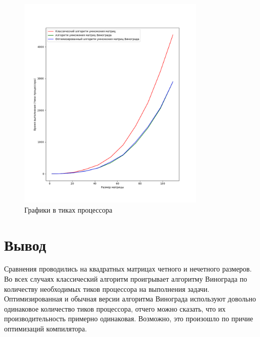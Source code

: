 \clearpage

\begin{figure}[h]
    \centering
    \includegraphics[width=0.8\textwidth]{images/Figure_1}
    \caption{Графики в тиках процессора}
    \label{fig:images-Figure_1}
\end{figure}

\section{Вывод}

Сравнения проводились на квадратных матрицах четного и нечетного размеров. Во всех случаях
классический алгоритм проигрывает алгоритму Винограда по количеству необходимых тиков
процессора на выполнения задачи. Оптимизированная и обычная версии алгоритма Винограда
используют довольно одинаковое количество тиков процессора, отчего можно сказать,
что их производительность примерно одинаковая. Возможно, это произошло по причие оптимизаций
компилятора.

